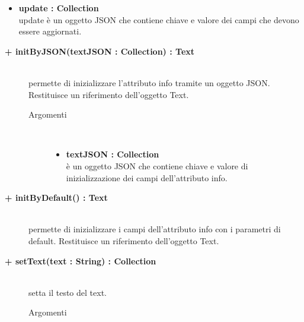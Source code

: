 \begin{description}
\begin{description}
\begin{description}
\begin{itemize}
					\item \textbf{update : Collection			} \hfill \\
					update è un oggetto JSON che contiene chiave e valore dei campi che devono essere aggiornati. 
				\end{itemize}
		\end{description}

\end{description}

\begin{description}
		\item[\textbf{\color{blue}+ initByJSON(textJSON : Collection) : Text			}] \hfill \\
			permette di inizializzare l'attributo info tramite un oggetto JSON. Restituisce un riferimento dell'oggetto Text. 
			
		\begin{description}
			\item[Argomenti] \hfill \\
				\begin{itemize}
				
					\item \textbf{textJSON : Collection			} \hfill \\
					è un oggetto JSON che contiene chiave e valore di inizializzazione dei campi dell'attributo info. 
				\end{itemize}
		\end{description}

\end{description}

\begin{description}
		\item[\textbf{\color{blue}+ initByDefault() : Text			}] \hfill \\
			permette di inizializzare i campi dell'attributo info con i parametri di default. Restituisce un riferimento dell'oggetto Text. 

\end{description}

\begin{description}
		\item[\textbf{\color{blue}+ setText(text : String) : Collection			}] \hfill \\
			setta il testo del text.
			
		\begin{description}
			\item[Argomenti] \hfill \\
				\begin{itemize}
				

\end{itemize}
\end{description}
\end{description}
\end{description}
